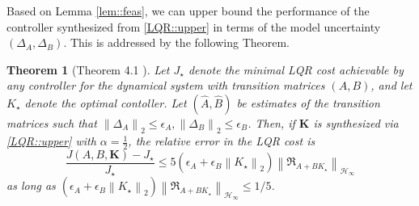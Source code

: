 \documentclass{article}[12pt]
\newtheorem{theorem}{Theorem}
\begin{document}
Based on Lemma \ref{lem::feas}, we can upper bound the performance of the controller synthesized from \eqref{LQR::upper} in terms of the model uncertainty $\left(\Delta_{A}, \Delta_{B}\right)$. This is addressed by the following Theorem.

\begin{theorem}[Theorem 4.1 \cite{dean2017sample}]
\label{thm::sub_opt}
Let $J_\star$ denote the minimal LQR cost achievable by any controller for the dynamical
system with transition matrices $(A,B)$, and let $K_\star$ denote the optimal contoller. 
Let $(\widehat{A}, \widehat{B})$ be
estimates of the transition matrices such that $\left\|\Delta_{A}\right\|_{2} \leq \epsilon_{A},\left\|\Delta_{B}\right\|_{2} \leq \epsilon_{B}$.
Then, if $\mathbf{K}$ is synthesized
via \eqref{LQR::upper} with $\alpha = \frac{1}{2}$, the relative error in the LQR cost is
\begin{equation}
    \frac{J(A, B, \mathbf{K})-J_{\star}}{J_{\star}} \leq 5\left(\epsilon_{A}+\epsilon_{B}\left\|K_{\star}\right\|_{2}\right)\left\|\mathfrak{R}_{A+B K_{\star}}\right\|_{\mathcal{H}_{\infty}}
\end{equation}
as long as $\left(\epsilon_{A}+\epsilon_{B}\left\|K_{\star}\right\|_{2}\right)\left\|\mathfrak{R}_{A+B K_{\star}}\right\|_{\mathcal{H}_{\infty}} \leq 1 / 5$.
\end{theorem}
\end{document}
